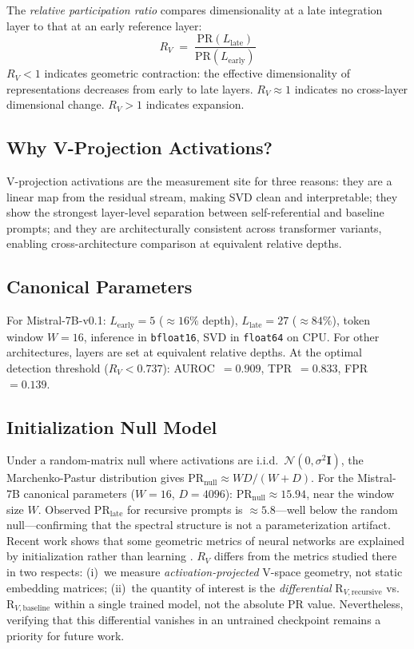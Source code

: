 \documentclass{article}
\newcommand{\RV}{R_V}
\newcommand{\PR}{\text{PR}}
\begin{document}
The \emph{relative participation ratio} compares dimensionality at a late integration layer to that
at an early reference layer:
\begin{equation}
    \RV \;=\; \frac{\PR(L_\mathrm{late})}{\PR(L_\mathrm{early})}
    \label{eq:rv}
\end{equation}
$\RV < 1$ indicates geometric contraction: the effective dimensionality of representations decreases
from early to late layers.
$\RV \approx 1$ indicates no cross-layer dimensional change.
$\RV > 1$ indicates expansion.

\subsection{Why V-Projection Activations?}

V-projection activations are the measurement site for three reasons:
they are a linear map from the residual stream, making SVD clean and interpretable;
they show the strongest layer-level separation between self-referential and baseline prompts;
and they are architecturally consistent across transformer variants, enabling cross-architecture
comparison at equivalent relative depths.

\subsection{Canonical Parameters}

For Mistral-7B-v0.1: $L_\mathrm{early} = 5$ (${\approx}16\%$ depth),
$L_\mathrm{late} = 27$ (${\approx}84\%$), token window $W = 16$,
inference in \texttt{bfloat16}, SVD in \texttt{float64} on CPU.
For other architectures, layers are set at equivalent relative depths.
At the optimal detection threshold ($\RV < 0.737$): AUROC~$= 0.909$,
TPR~$= 0.833$, FPR~$= 0.139$.

\subsection{Initialization Null Model}
\label{sec:null}

Under a random-matrix null where activations are i.i.d.\
$\mathcal{N}(0, \sigma^2\mathbf{I})$, the Marchenko-Pastur distribution gives
$\PR_\mathrm{null} \approx W D / (W + D)$.
For the Mistral-7B canonical parameters ($W = 16$, $D = 4096$):
$\PR_\mathrm{null} \approx 15.94$, near the window size $W$.
Observed $\PR_\mathrm{late}$ for recursive prompts is $\approx 5.8$---well below the
random null---confirming that the spectral structure is not a parameterization artifact.
Recent work shows that some geometric metrics of neural networks are explained by
initialization rather than learning \citep{lee2025shared}.
$\RV$ differs from the metrics studied there in two respects:
(i)~we measure \emph{activation-projected} V-space geometry, not static embedding matrices;
(ii)~the quantity of interest is the \emph{differential}
$\mathrm{R}_{V,\mathrm{recursive}}$ vs.\ $\mathrm{R}_{V,\mathrm{baseline}}$
within a single trained model, not the absolute PR value.
Nevertheless, verifying that this differential vanishes in an untrained checkpoint
remains a priority for future work.
\end{document}
